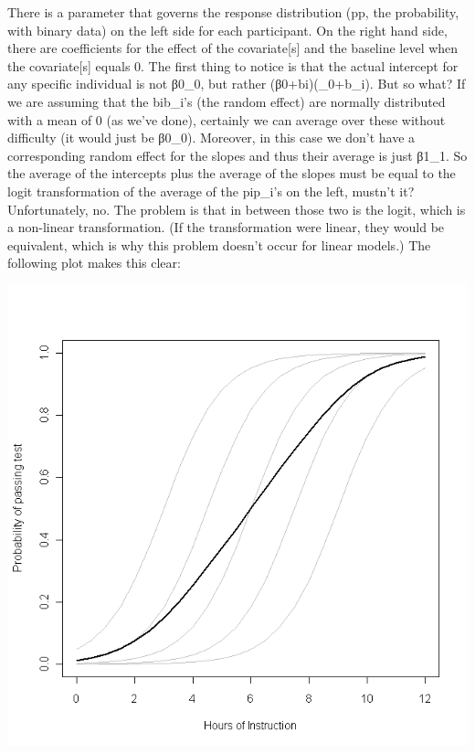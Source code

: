 \documentclass[
]{book}
\begin{document}
There is a parameter that governs the response distribution (pp, the probability, with binary data) on the left side for each participant. On the right hand side, there are coefficients for the effect of the covariate{[}s{]} and the baseline level when the covariate{[}s{]} equals 0. The first thing to notice is that the actual intercept for any specific individual is not β0\beta\_0, but rather (β0+bi)(\beta\_0+b\_i). But so what? If we are assuming that the bib\_i's (the random effect) are normally distributed with a mean of 0 (as we've done), certainly we can average over these without difficulty (it would just be β0\beta\_0). Moreover, in this case we don't have a corresponding random effect for the slopes and thus their average is just β1\beta\_1. So the average of the intercepts plus the average of the slopes must be equal to the logit transformation of the average of the pip\_i's on the left, mustn't it? Unfortunately, no. The problem is that in between those two is the logit, which is a non-linear transformation. (If the transformation were linear, they would be equivalent, which is why this problem doesn't occur for linear models.) The following plot makes this clear:

\includegraphics{fig/glmm_logit_StackOverflow.png}
\end{document}
